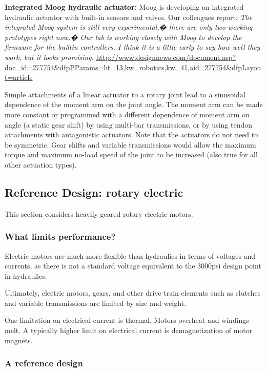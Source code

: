 \documentclass[letterpaper,12pt,fullpage]{article}
\begin{document}
{\bf Integrated Moog hydraulic actuator:}
Moog is developing an integrated hydraulic actuator with built-in
sensors and valves. Our colleagues report:
{\it The integrated Moog system is still very experimental,� there are
only two working prototypes right now.� Our lab is working closely
with Moog to develop the firmware for the builtin controllers. I
think it is a little early to say how well they work, but it looks
promising.}
\url{http://www.designnews.com/document.asp?doc_id=277754&dfpPParams=ht_13,kw_robotics,kw_41,aid_277754&dfpLayout=article}

Simple attachments of a linear actuator to a rotary joint lead to
a sinusoidal dependence of the moment arm on the joint angle.
The moment arm can be made more constant or programmed with
a different dependence of moment arm on angle (a static gear shift)
by using multi-bar transmissions,
or by using tendon attachments with antagonistic actuators.
Note that the actuators do not need to be symmetric.
Gear shifts and variable transmissions would allow the maximum torque
and maximum no-load speed of the joint to be increased (also true
for all other actuation types).

\subsection{Reference Design: rotary electric}

This section considers heavily geared rotary electric motors.

\subsubsection{What limits performance?}

Electric motors are much more flexible than hydraulics in terms of voltages
and currents, as there is not a standard voltage equivalent to the 3000psi
design point in hydraulics.

Ultimately, electric motors, gears, and other drive train elements such
as clutches and variable transmissions are limited by size and weight.

One limitation on electrical current
is thermal. Motors overheat and windings melt.
A typically 
higher limit on electrical current is demagnetization of motor magnets.

\subsubsection{A reference design}
\end{document}
